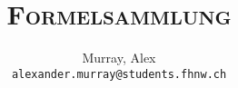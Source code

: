 \author{%
    Murray, Alex\\
    \texttt{alexander.murray@students.fhnw.ch}
}

\title{
    \Huge{\textsc{Formelsammlung}}
}
